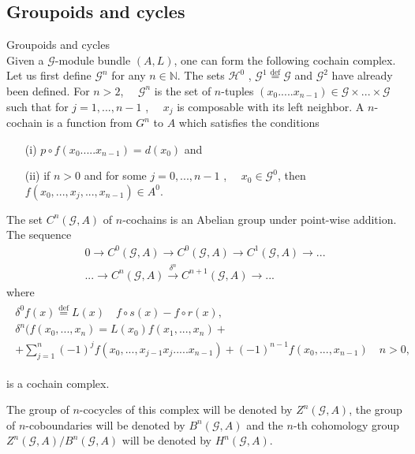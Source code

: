 \documentclass{beamer}
\theoremstyle{plain}
\newcommand{\G}{\mathcal{G}}
\newcommand{\N}{\mathbb{N}}                  %
\renewcommand{\H}{\mathcal{H}}               %
\newcommand{\bean}{\begin{eqnarray*}}
\newcommand{\eean}{\end{eqnarray*}}
\newcommand{\bydef}{\stackrel{\mathrm{def}}{=}}
\begin{document}
\subsection{Groupoids and cycles}
\begin{frame}
	\huge Groupoids and cycles \normalsize\\
	Given a $\G$-module bundle $( A , L )$, one can form the following cochain complex. Let
	us first define $\G^n$ for any $n\in\N$. The sets $\H^0$ , $\G^1\bydef \G$ and $\G^2$ have already been defined. For $n> 2$, $\quad \G^n$ is the set of $n$-tuples $(x_0 . . . . . x_{n-1}) \in \G\times...\times \G$ such that for $
	j = 1 , . . . , n - 1$ , $\quad x_j$ is composable with its left  neighbor. A $n$-cochain is a function from $G^n$ to $A$ which satisfies the conditions
	\begin{enumerate}
		\item[(i)] $p\circ f(x_0 . . . . . x_{n-1}) = d(x_0)$ and
		\item[(ii)] if $n > 0$ and for some $j = 0, . . . , n - 1$ , $\quad x_0 \in \G^0$, then $f ( x_0, ..., x_j , ..., x_{n-1})\in A^0$.
	\end{enumerate}
	\end{frame}
	\begin{frame}
	The set $C^n\left(\G, A\right)$ of $n$-cochains is an Abelian group under point-wise addition. The
	sequence 
	\bean
	0 \to C^0\left( \G, A\right)\to C^0\left( \G, A\right)\to C^1\left( \G, A\right)\to...\\...\to  C^n\left( \G, A\right) \xrightarrow{\delta^n} C^{n + 1}\left( \G, A\right)\to ...
	\eean
	where 
	\bean
	\begin{split}
		\delta^0f(x)\bydef L(x)\quad  f\circ s(x) - f \circ r ( x ),\\
		\delta^n(f(x_0 ,..., x_n) = L ( x_0 ) f ( x_1,..., x_n) +\\+ \sum_{j=1}^n (-1)^j
		f ( x_0 ,..., x_{j-1}x_j . . . . . x_{n-1})+(-1)^{n-1} f ( x_0 , . . . , x_{n-1}) \quad  n > 0,
	\end{split}
	\eean
	
	is a cochain complex.
	
\begin{definition}\label{groupoid_cocycle_defn}
	The group of $n$-cocycles of this complex will be denoted by $Z^n(\G,A)$,
	the group of $n$-coboundaries will be denoted by $B^n(\G,A)$ and the $n$-th cohomology group
	$Z^n(\G,A)/B^n(\G,A)$ will be denoted by $H^n(\G,A)$.
\end{definition}
\end{frame}
\end{document}
